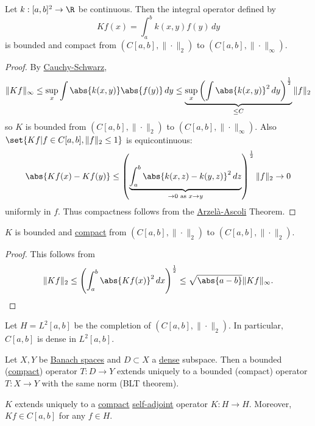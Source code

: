\documentclass{article}
\begin{document}
\begin{lemma}
    Let $k:[a,b]^2 \to \R$ be continuous.
    Then the integral operator defined by
    \begin{equation*}
        K f(x) = \int_a^b k(x,y) f(y) \, dy
    \end{equation*}
    is bounded and compact from $(C[a,b],\|\cdot\|_2)$ to $(C[a,b],\|\cdot\|_\infty)$.
\end{lemma}

\begin{proof}
    By \hyperlink{thm:cs}{Cauchy-Schwarz},
    \begin{equation*}
        \|Kf\|_\infty \leq \sup_x \int \abs{k(x,y)} \abs{f(y)} \, dy \leq \underbrace{\sup_x \left(\int \abs{k(x,y)}^2 \, dy\right)^\frac{1}{2}}_{\leq C} \|f\|_2
    \end{equation*}
    so $K$ is bounded from $(C[a,b],\|\cdot\|_2)$ to $(C[a,b],\|\cdot\|_\infty)$.
    Also $\set{K f | f \in C[a,b], \|f\|_2 \leq 1}$ is equicontinuous:
    \begin{equation*}
        \abs{K f(x) - K f(y)} \leq \left(\underbrace{\int_a^b \abs{k(x,z) - k(y,z)}^2 \, dz}_{\to 0 \text{ as } x \to y}\right)^\frac{1}{2} \|f\|_2 \to 0
    \end{equation*}
    uniformly in $f$.
    Thus compactness follows from the \hyperlink{thm:aa}{Arzel\`a-Ascoli} Theorem.
\end{proof}

\begin{cor}
    $K$ is bounded and \hyperlink{def:compact}{compact} from $(C[a,b], \|\cdot\|_2)$ to $(C[a,b], \|\cdot\|_2)$.
\end{cor}

\begin{proof}
    This follows from
    \begin{equation*}
        \|Kf\|_2 \leq \left(\int_a^b \abs{K f(x)}^2 \, dx\right)^\frac{1}{2} \leq \sqrt{\abs{a-b}} \|K f\|_\infty. \qedhere
    \end{equation*}
\end{proof}

Let $H = L^2[a,b]$ be the completion of $(C[a,b], \|\cdot\|_2)$.
In particular, $C[a,b]$ is dense in $L^2[a,b]$.

\begin{fact}
    Let $X,Y$ be \hyperlink{def:banach}{Banach spaces} and $D \subset X$ a \hyperlink{def:dense}{dense} subspace.
    Then a bounded (\hyperlink{def:compact}{compact}) operator $T:D \to Y$ extends uniquely to a bounded (compact) operator $T:X \to Y$ with the same norm (BLT theorem).
\end{fact}
\begin{cor}
    $K$ extends uniquely to a \hyperlink{def:compact}{compact} \hyperlink{def:normalMap}{self-adjoint} operator $K: H \to H$.
    Moreover, $Kf \in C[a,b]$ for any $f \in H$.
\end{cor}
\end{document}
